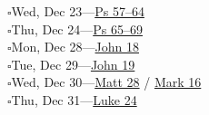 \hypertarget{rp-2026-12-23}{}\noindent$\square$\enspace Wed, Dec 23\enspace---\enspace \hyperlink{ch-psalms-57}{Ps 57--64}\\
\hypertarget{rp-2026-12-24}{}\noindent$\square$\enspace Thu, Dec 24\enspace---\enspace \hyperlink{ch-psalms-65}{Ps 65--69}\\
\hypertarget{rp-2026-12-28}{}\noindent$\square$\enspace Mon, Dec 28\enspace---\enspace \hyperlink{ch-john-18}{John 18}\\
\hypertarget{rp-2026-12-29}{}\noindent$\square$\enspace Tue, Dec 29\enspace---\enspace \hyperlink{ch-john-19}{John 19}\\
\hypertarget{rp-2026-12-30}{}\noindent$\square$\enspace Wed, Dec 30\enspace---\enspace \hyperlink{ch-matthew-28}{Matt 28} / \hyperlink{ch-mark-16}{Mark 16}\\
\hypertarget{rp-2026-12-31}{}\noindent$\square$\enspace Thu, Dec 31\enspace---\enspace \hyperlink{ch-luke-24}{Luke 24}\\
\clearpage
\twocolumn[%
  \vspace*{20pt}%
  {\centering\huge\booktitlefont\scshape January 2027\\%
  \char"2766\par}%
  \vspace{10pt}%
]

